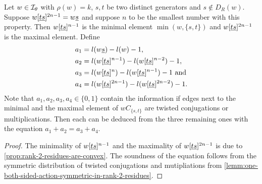 \begin{coro}
	Let $w \in \mathcal{I}_{\theta}$ with $\rho(w) = k$, $s,t$ be two distinct generators and $s \notin D_R(w)$. Suppose $w[\underline{t} \underline{s}]^{2n-1} = w \underline{s}$ and suppose $n$ to be the smallest number with this property. Then $w[\underline{t} \underline{s}]^{n-1}$ is the minimal element $\min(w,\{s,t\})$ and $w[\underline{t} \underline{s}]^{2n-1}$ is the maximal element. Define
	\begin{align*}
		a_1 & = l(w \underline{s}) - l(w) - 1, \\
		a_2 & = l(w[\underline{t} \underline{s}]^{n-1}) - l(w[\underline{t} \underline{s}]^{n-2}) - 1, \\
		a_3 & = l(w[\underline{t} \underline{s}]^{n}) - l(w[\underline{t} \underline{s}]^{n-1}) - 1 \textrm{ and} \\
		a_4 & = l(w[\underline{t} \underline{s}]^{2n-1}) - l(w[\underline{t} \underline{s}]^{2n-2}) - 1.
	\end{align*}
	Note that $a_1,a_2,a_3,a_4 \in \{0,1\}$ contain the information if edges next to the minimal and the maximal element of $wC_{\{s,t\}}$ are twisted conjugations or multiplications. Then each can be deduced from the three remaining ones with the equation $a_1+a_2=a_3+a_4$.

	\begin{proof}
		The minimality of $w[\underline{t} \underline{s}]^{n-1}$ and the maximality of $w[\underline{t} \underline{s}]^{2n-1}$ is due to \ref{prop:rank-2-residues-are-convex}. The soundness of the equation follows from the symmetric distribution of twisted conjugations and mutipliations from \ref{lemm:one-both-sided-action-symmetric-in-rank-2-residues}.
	\end{proof}
\end{coro}

